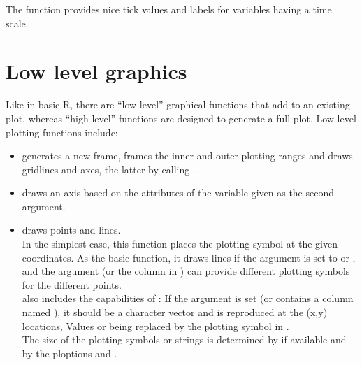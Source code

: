 \documentclass[11pt]{article}\usepackage[]{graphicx}\usepackage[]{color}
\begin{document}

The function  provides nice tick values and labels for 
variables having a time scale. 

\section{Low level graphics}

Like in basic R, there are ``low level'' graphical functions that
add to an existing plot, whereas ``high level'' functions are designed to 
generate a full plot. Low level plotting functions include:

\begin{itemize}
\item 
{} generates a new frame, frames the inner and outer plotting
ranges and draws gridlines and axes, the latter by calling . 
\item
   draws an axis based on the attributes of the variable given as
  the second argument.   
\item
{} draws points and lines. \\
  In the simplest case, this function places the plotting symbol at the
  given coordinates. As the basic  function, it draws lines if 
  the argument  is set to  or , and the argument
   (or the column  in ) can provide
  different plotting symbols for the different points.\\
   also includes the capabilities of : 
  If the argument  
  is set (or  contains a column named ),
  it should be a character vector and is reproduced at the (x,y) locations,
  Values  or  being replaced by the plotting symbol in .\\
  The size of the plotting symbols or strings is determined by
   if available and by the ploptions
   and .


\end{itemize}
\end{document}
